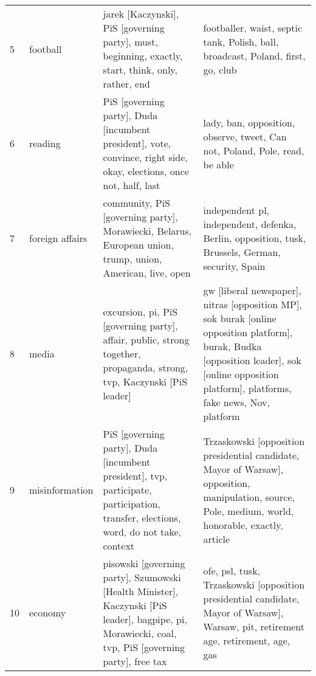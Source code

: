 \begin{tabular}{p{2cm}p{2cm}p{5cm}p{5cm}}
           5 &                 football &                                                                               jarek [Kaczynski], PiS [governing party], must, beginning, exactly, start, think, only, rather, end &                                                                                                                 footballer, waist, septic tank, Polish, ball, broadcast, Poland, first, go, club \\
           6 &                  reading &                                                              PiS [governing party], Duda [incumbent president], vote, convince, right side, okay, elections, once not, half, last &                                                                                                                      lady, ban, opposition, observe, tweet, Can not, Poland, Pole, read, be able \\
           7 &          foreign affairs &                                                                         community, PiS [governing party], Morawiecki, Belarus, European union, trump, union, American, live, open &                                                                                                independent pl, independent, defenka, Berlin, opposition, tusk, Brussels, German, security, Spain \\
           8 &                    media &                                                            excursion, pi, PiS [governing party], affair, public, strong together, propaganda, strong, tvp, Kaczynski [PiS leader] &  gw [liberal newspaper], nitras [opposition MP], sok burak [online opposition platform], burak, Budka [opposition leader], sok [online opposition platform], platforms, fake news, Nov, platform \\
           9 &           misinformation &                                               PiS [governing party], Duda [incumbent president], tvp, participate, participation, transfer, elections, word, do not take, context &                                             Trzaskowski [opposition presidential candidate, Mayor of Warsaw], opposition, manipulation, source, Pole, medium, world, honorable, exactly, article \\
          10 &                  economy &                              pisowski [governing party], Szumowski [Health Minister], Kaczynski [PiS leader], bagpipe, pi, Morawiecki, coal, tvp, PiS [governing party], free tax &                                                              ofe, psl, tusk, Trzaskowski [opposition presidential candidate, Mayor of Warsaw], Warsaw, pit, retirement age, retirement, age, gas \\

\end{tabular}
